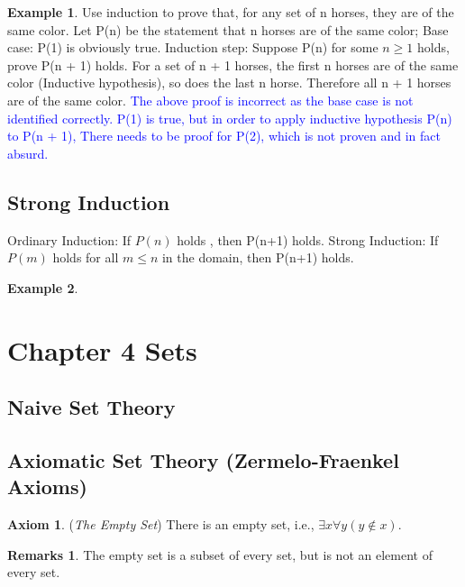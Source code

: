 \documentclass[14pt]{article}
\theoremstyle{definition}
\newtheorem*{remark}{Remarks}
\newtheorem*{example}{Example}
\newtheorem{axiom}[definition]{Axiom}
\begin{document}
\begin{example}
    Use induction to prove that, for any set of n horses, they are of the same color.\newline
    Let P(n) be the statement that n horses are of the same color; \newline
    Base case: P(1) is obviously true. \newline
    Induction step: Suppose P(n) for some $n \geq 1$ holds, prove P(n + 1) holds. \newline
    For a set of n + 1 horses, the first n horses are of the same color (Inductive hypothesis), so does the last n horse.
    Therefore all n + 1 horses are of the same color.\newline
    \textcolor{blue}{The above proof is incorrect as the base case is not identified correctly.
    P(1) is true, but in order to apply inductive hypothesis P(n) to P(n + 1), There needs to be proof for P(2), which is not proven and in fact absurd.}
\end{example}

\subsection{Strong Induction} 
Ordinary Induction: If $P(n)$ holds , then P(n+1) holds. \newline
Strong Induction: If $P(m)$ holds for all $m \leq n$ in the domain, then P(n+1) holds.
\begin{example}
   
\end{example}

\section{Chapter 4 Sets}
\subsection{Naive Set Theory}

\subsection{Axiomatic Set Theory (Zermelo-Fraenkel Axioms)}
\begin{axiom}
    (\textit{The Empty Set}) There is an empty set, i.e., $\exists x \forall y(y\notin x)$.
\end{axiom}
\begin{remark}
    The empty set is a subset of every set, but is not an element of every set.
\end{remark}
\end{document}
